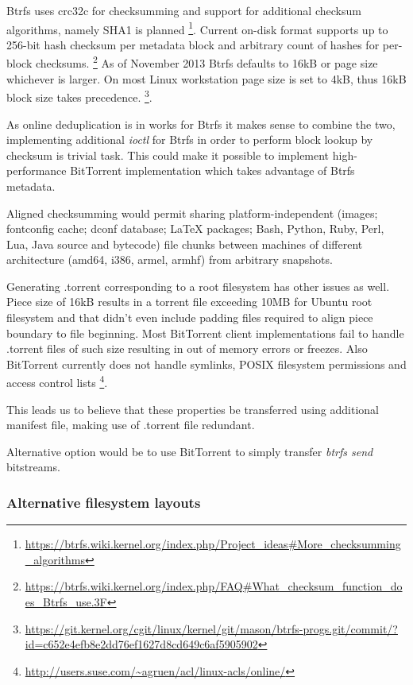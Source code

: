 \documentclass{article}
\begin{document}
Btrfs uses crc32c for checksumming and support for additional
checksum algorithms, namely SHA1 is planned
\footnote{\url{https://btrfs.wiki.kernel.org/index.php/Project_ideas#More_checksumming_algorithms}}.
Current on-disk format supports up to 256-bit hash checksum per
metadata block and arbitrary count of hashes for per-block checksums.
\footnote{\url{https://btrfs.wiki.kernel.org/index.php/FAQ#What_checksum_function_does_Btrfs_use.3F}}
As of November 2013 Btrfs defaults to 16kB or page size
whichever is larger.
On most Linux workstation page size is set to 4kB, thus 16kB block
size takes precedence.
\footnote{\url{https://git.kernel.org/cgit/linux/kernel/git/mason/btrfs-progs.git/commit/?id=c652e4efb8e2dd76ef1627d8cd649c6af5905902}}.

As online deduplication is in works for Btrfs it makes sense to
combine the two, implementing additional \emph{ioctl} for Btrfs in
order to perform block lookup by checksum is trivial task.
This could make it possible to implement high-performance
BitTorrent implementation which takes advantage of Btrfs metadata.

Aligned checksumming would permit sharing platform-independent
(images; fontconfig cache; dconf database; LaTeX packages;
Bash, Python, Ruby, Perl, Lua, Java source and bytecode)
file chunks between machines of different architecture (amd64, i386, armel, armhf)
from arbitrary snapshots.

Generating .torrent corresponding to a root filesystem
has other issues as well.
Piece size of 16kB results in a torrent file
exceeding 10MB for Ubuntu root filesystem and that didn't even
include padding files required to align piece boundary to file beginning.
Most BitTorrent client implementations fail to handle .torrent
files of such size resulting in out of memory errors or freezes.
Also BitTorrent currently does not handle symlinks,
POSIX filesystem permissions and access control lists
\footnote{\url{http://users.suse.com/~agruen/acl/linux-acls/online/}}.

This leads us to believe that these properties be transferred
using additional manifest file, making use of .torrent file redundant.

Alternative option would be to use BitTorrent to simply
transfer \emph{btrfs send} bitstreams.


\subsubsection{Alternative filesystem layouts}
\end{document}
